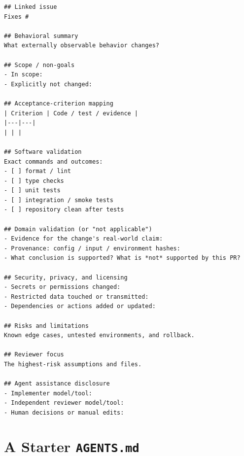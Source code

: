 \documentclass[11pt]{article}
\begin{document}
\begin{lstlisting}[style=gw]
## Linked issue
Fixes #

## Behavioral summary
What externally observable behavior changes?

## Scope / non-goals
- In scope:
- Explicitly not changed:

## Acceptance-criterion mapping
| Criterion | Code / test / evidence |
|---|---|
| | |

## Software validation
Exact commands and outcomes:
- [ ] format / lint
- [ ] type checks
- [ ] unit tests
- [ ] integration / smoke tests
- [ ] repository clean after tests

## Domain validation (or "not applicable")
- Evidence for the change's real-world claim:
- Provenance: config / input / environment hashes:
- What conclusion is supported? What is *not* supported by this PR?

## Security, privacy, and licensing
- Secrets or permissions changed:
- Restricted data touched or transmitted:
- Dependencies or actions added or updated:

## Risks and limitations
Known edge cases, untested environments, and rollback.

## Reviewer focus
The highest-risk assumptions and files.

## Agent assistance disclosure
- Implementer model/tool:
- Independent reviewer model/tool:
- Human decisions or manual edits:
\end{lstlisting}

\section{A Starter \texttt{AGENTS.md}}
\label{app:agentsmd}
\end{document}
